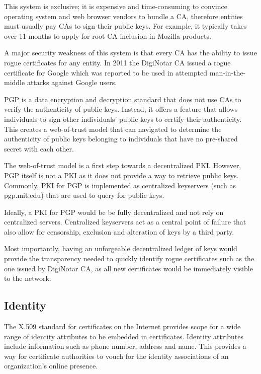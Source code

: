 \documentclass[12pt,a4paper]{report}
\begin{document}
	This system is exclusive; it is expensive and time-consuming to convince operating system and web browser vendors to bundle a CA, therefore entities must usually pay CAs to sign their public keys. For example, it typically takes over 11 months to apply for root CA inclusion in Mozilla products\cite{6}.
	 
	A major security weakness of this system is that every CA has the ability to issue rogue certificates for any entity. In 2011 the DigiNotar CA issued a rogue certificate for Google which was reported to be used in attempted man-in-the-middle attacks against Google users\cite{7}.

	PGP is a data encryption and decryption standard that does not use CAs to verify the authenticity of public keys. Instead, it offers a feature that allows individuals to sign other individuals' public keys to certify their authenticity. This creates a web-of-trust model that can navigated to determine the authenticity of public keys belonging to individuals that have no pre-shared secret with each other.\cite{2}

	The web-of-trust model is a first step towards a decentralized PKI. However, PGP itself is not a PKI as it does not provide a way to retrieve public keys. Commonly, PKI for PGP is implemented as centralized keyservers (such as pgp.mit.edu) that are used to query for public keys.

	Ideally, a PKI for PGP would be be fully decentralized and not rely on centralized servers. Centralized keyservers act as a central point of failure that also allow for censorship, exclusion and alteration of keys by a third party.
	
	Most importantly, having an unforgeable decentralized ledger of keys would provide the transparency needed to quickly identify rogue certificates such as the one issued by DigiNotar CA, as all new certificates would be immediately visible to the network.
	
	\subsection{Identity}
	The X.509 standard for certificates on the Internet provides scope for a wide range of identity attributes to be embedded in certificates.\cite{8} Identity attributes include information such as phone number, address and name. This provides a way for certificate authorities to vouch for the identity associations of an organization's online presence.
	
\end{document}
